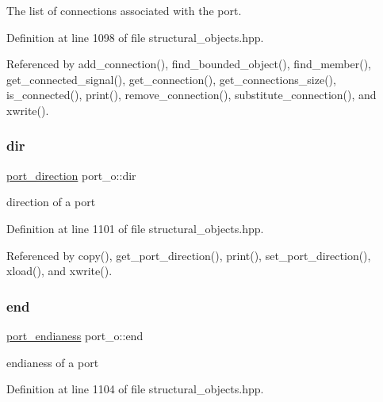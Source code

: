 The list of connections associated with the port. 



Definition at line 1098 of file structural\+\_\+objects.\+hpp.



Referenced by add\+\_\+connection(), find\+\_\+bounded\+\_\+object(), find\+\_\+member(), get\+\_\+connected\+\_\+signal(), get\+\_\+connection(), get\+\_\+connections\+\_\+size(), is\+\_\+connected(), print(), remove\+\_\+connection(), substitute\+\_\+connection(), and xwrite().

\mbox{\label{structport__o_a27f4a8d47d3f3b064d72443da1ee450c}} 
\subsubsection{\texorpdfstring{dir}{dir}}
{\footnotesize\ttfamily \hyperlink{structport__o_adb254df5665ff28b0769491cc3899fd5}{port\+\_\+direction} port\+\_\+o\+::dir\hspace{0.3cm}{\ttfamily [private]}}



direction of a port 



Definition at line 1101 of file structural\+\_\+objects.\+hpp.



Referenced by copy(), get\+\_\+port\+\_\+direction(), print(), set\+\_\+port\+\_\+direction(), xload(), and xwrite().

\mbox{\label{structport__o_a1d392170891caecd4e6a4888b25cec38}} 
\subsubsection{\texorpdfstring{end}{end}}
{\footnotesize\ttfamily \hyperlink{structport__o_a7f16c53245215df0064e1b8ef27a36e3}{port\+\_\+endianess} port\+\_\+o\+::end\hspace{0.3cm}{\ttfamily [private]}}



endianess of a port 



Definition at line 1104 of file structural\+\_\+objects.\+hpp.



